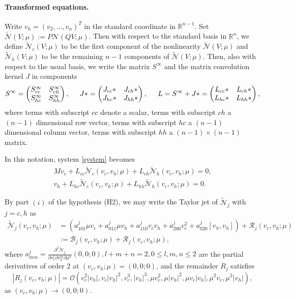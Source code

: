 \documentclass[letterpaper,11pt]{article}
\newcommand{\R}{\mathbb{R}}
\newcommand{\rmO}{\mathcal{O}}
\newcommand{\B}{\mathcal{B}}
\newcommand{\Rm}{\mathcal{R}}
\newcommand{\Nl}{\mathcal{N}}
\numberwithin{equation}{section}
\theoremstyle{plain}
\theoremstyle{remark}
\begin{document}
\paragraph{Transformed equations.} 
Write $v_h = (v_2,\ldots,v_{n})^T$ in the standard coordinate in $\R^{n-1}$. Set $\tilde{\Nl}(V;\mu) :=P\Nl(QV;\mu)$. Then with respect to the standard basis in $\R^n$, we define $\tilde{\Nl}_c(V;\mu)$ to be the first component of the nonlinearity $\tilde{\Nl}(V;\mu)$ and $\tilde{\Nl}_h(V;\mu)$ to be the remaining $n-1$ components of $\tilde{\Nl}(V;\mu)$. Then, also with respect to the usual basis, we write the matrix $S^\infty$ and the matrix convolution kernel $J$ in components
\[
S^{\infty} = \begin{pmatrix}
S^{\infty}_{cc} & S^{\infty}_{ch}\\
S^{\infty}_{hc} & S^{\infty}_{hh} 
\end{pmatrix}, \hspace{0.2in}
J\ast = \begin{pmatrix}
J_{cc}\ast & J_{ch}\ast \\
J_{hc}\ast & J_{hh}\ast 
\end{pmatrix}, \hspace{0.2in}
L  = S^\infty+J\ast = \begin{pmatrix}
L_{cc}\ast & L_{ch}\ast \\
L_{hc}\ast & L_{hh}\ast 
\end{pmatrix},
\]
where terms with subscript $cc$ denote a scalar, terms with subscript $ch$ a $(n-1)$ dimensional row vector, terms with subscript $hc$ a $(n-1)$ dimensional column vector, terms with subscript $hh$ a $(n-1)\times (n-1)$ matrix.

In this notation, system \eqref{system} becomes
\begin{align}
M v_c + L_{cc}\tilde{\Nl}_c(v_c,v_h;\mu) + L_{ch}\tilde{\Nl}_h(v_c,v_h;\mu)= 0\label{exeqnu0},\\
v_h +  L_{hc}\tilde{\Nl}_c(v_c,v_h;\mu) + L_{hh}\tilde{\Nl}_h(v_c,v_h;\mu) = 0 \label{exeqnuh}.
\end{align}


By part $(i)$ of the hypothesis (H2), we may write the Taylor jet of $\tilde{\Nl}_j$ with $j=c,h$ as
\begin{align*}
\tilde{\Nl}_j(v_c,v_h;\mu) &=\left( a^j_{101} \mu v_c+a^j_{011}\mu v_h+a^j_{110}v_cv_h + a^j_{200}v_c^2+a^j_{020}[v_h,v_h] \right)+ \Rm_j(v_c,v_h;\mu)\\
&:= \B_j(v_c,v_h;\mu)+\Rm_j(v_c,v_h;\mu),
\end{align*}
where $a^j_{lmn} = \frac{\partial^2 \tilde{\Nl}_j}{\partial v_c^l \partial v_h^m \partial \mu^n}(0,0;0), l+m+n=2, 0\le l,m,n\le 2$ are the partial derivatives of order $2$ at $(v_c,v_h;\mu)=(0,0;0)$, and the remainder $R_j$ satisfies 
\begin{equation}\label{odR}
|R_j(v_c,v_h;\mu)| = \rmO(v_c^2|v_h|,v_c|v_h|^2,v_c^3,|v_h|^3,\mu v_c^2, \mu |v_h|^2,\mu v_c|v_h|, \mu^2v_c, \mu^2|v_h|),
\end{equation} 
as $(v_c,v_h;\mu) \to (0,0;0)$.
\end{document}
